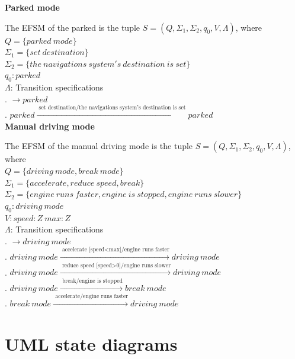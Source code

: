 \documentclass[12pt]{article}
\begin{document}
\begin{spacing}{1.5}
\newpage
\noindent \textbf{Parked mode}

\noindent The EFSM of the parked is the tuple $S = (Q, \Sigma_1, \Sigma_2, q_0, V, \Lambda)$, where\\

\noindent $Q = \{parked~mode\}$\\
\noindent $\Sigma_1 = \{set~destination\}$\\
\noindent $\Sigma_2 = \{the~navigations~system's~destination~is~set\}$\\
\noindent $q_0: parked$\\
\noindent $\Lambda$: Transition specifications\\
. $\rightarrow parked$\\
. $parked \xrightarrow {\text { set~destination/the~navigations~system's~destination~is~set}} parked$\\

\newpage
\noindent \textbf{Manual driving mode}

\noindent The EFSM of the manual driving mode is the tuple $S = (Q, \Sigma_1, \Sigma_2, q_0, V, \Lambda)$, where\\

\noindent $Q = \{driving~mode, break~mode\}$\\
\noindent $\Sigma_1 = \{accelerate,reduce~speed,break\}$\\
\noindent $\Sigma_2 = \{engine~runs~faster,engine~is~stopped,
engine~runs~slower\}$\\
\noindent $q_0: driving~mode$\\
\noindent $V: speed:Z~max:Z$\\
\noindent $\Lambda$: Transition specifications\\
. $\rightarrow driving~mode$\\
. $driving~mode \xrightarrow {\text { accelerate~[speed<max]/engine~runs~faster}} driving~mode$\\
. $driving~mode \xrightarrow {\text { reduce~speed~[speed>0]/engine~runs~slower}} driving~mode$\\
. $driving~mode \xrightarrow {\text { break/engine~is~stopped}} break~mode$\\
. $break~mode \xrightarrow {\text { accelerate/engine~runs~faster}} driving~mode$\\
\newpage

\section{UML state diagrams}


\end{spacing}
\end{document}
